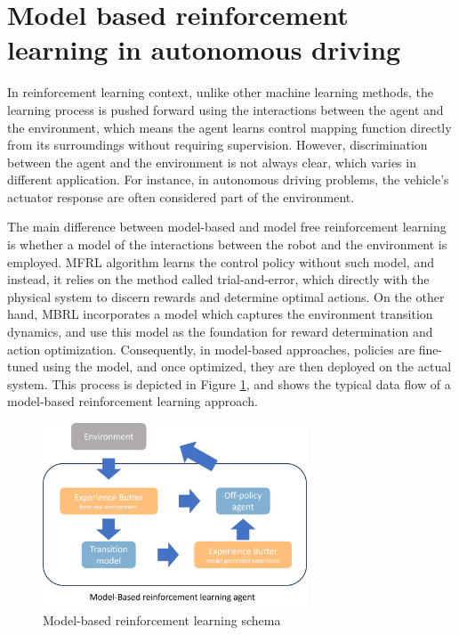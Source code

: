 \section{Model based reinforcement learning in autonomous driving}

In reinforcement learning context, unlike other machine learning methods, the learning process is pushed forward using the interactions between the agent and the environment, which means the agent learns control mapping function directly from its surroundings without requiring supervision. However, discrimination between the agent and the environment is not always clear, which varies in different application. For instance, in autonomous driving problems, the vehicle's actuator response are often considered part of the environment.

The main difference between model-based and model free reinforcement learning is whether a model of the interactions between the robot and the environment is employed. MFRL algorithm learns the control policy without such model, and instead, it relies on the method called trial-and-error, which directly with the physical system to discern rewards and determine optimal actions. On the other hand, MBRL incorporates a model which captures the environment transition dynamics, and use this model as the foundation for reward determination and action optimization. Consequently, in model-based approaches, policies are fine-tuned using the model, and once optimized, they are then deployed on the actual system. This process is depicted in Figure \ref{fig: mbrl schema.png}, and shows the typical data flow of a model-based reinforcement learning approach.

\begin{figure}[h]
    \centering
    \includegraphics[width=0.7\textwidth]{fig/mbrl schema.png}
    \caption{Model-based reinforcement learning schema}
    \label{fig: mbrl schema.png}
\end{figure}

